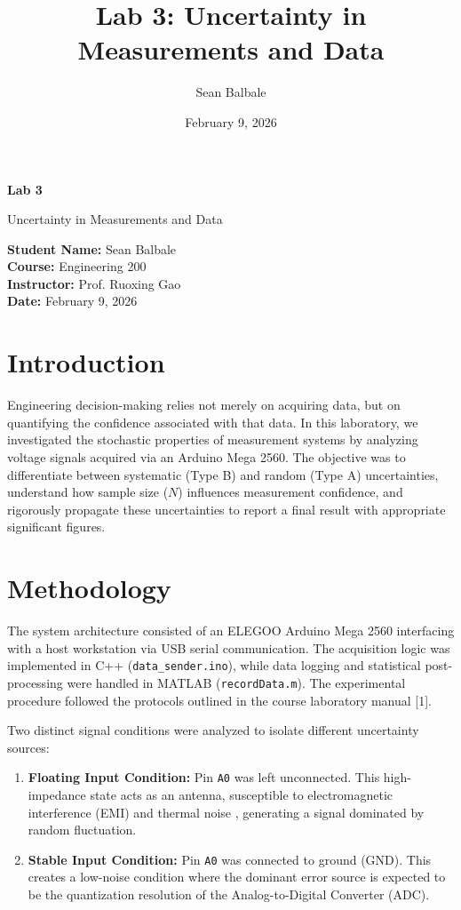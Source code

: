 \documentclass[11pt]{article}
\title{Lab 3: Uncertainty in Measurements and Data}
\author{Sean Balbale}
\date{February 9, 2026}
\begin{document}
\begin{titlepage}
  \begin{center}
    \vspace*{1in}

    \Huge
    \textbf{Lab 3}

    \LARGE
    Uncertainty in Measurements and Data

    \vspace{3in}

    \textbf{Student Name:} Sean Balbale
    \\ \textbf{Course:} Engineering 200
    \\ \textbf{Instructor:} Prof. Ruoxing Gao
    \\ \textbf{Date:} February 9, 2026

    \vfill

  \end{center}
\end{titlepage}

\newpage

\section{Introduction}
Engineering decision-making relies not merely on acquiring data, but on quantifying the confidence associated with that data. In this laboratory, we investigated the stochastic properties of measurement systems by analyzing voltage signals acquired via an Arduino Mega 2560. The objective was to differentiate between systematic (Type B) and random (Type A) uncertainties, understand how sample size ($N$) influences measurement confidence, and rigorously propagate these uncertainties to report a final result with appropriate significant figures.

\section{Methodology}
The system architecture consisted of an ELEGOO Arduino Mega 2560 interfacing with a host workstation via USB serial communication. The acquisition logic was implemented in C++ (\texttt{data\_sender.ino}), while data logging and statistical post-processing were handled in MATLAB (\texttt{recordData.m}). The experimental procedure followed the protocols outlined in the course laboratory manual [1].

Two distinct signal conditions were analyzed to isolate different uncertainty sources:
\begin{enumerate}
  \item \textbf{Floating Input Condition:} Pin \texttt{A0} was left unconnected. This high-impedance state acts as an antenna, susceptible to electromagnetic interference (EMI) and thermal noise , generating a signal dominated by random fluctuation.
  \item \textbf{Stable Input Condition:} Pin \texttt{A0} was connected to ground (GND). This creates a low-noise condition where the dominant error source is expected to be the quantization resolution of the Analog-to-Digital Converter (ADC).
\end{enumerate}
\end{document}
